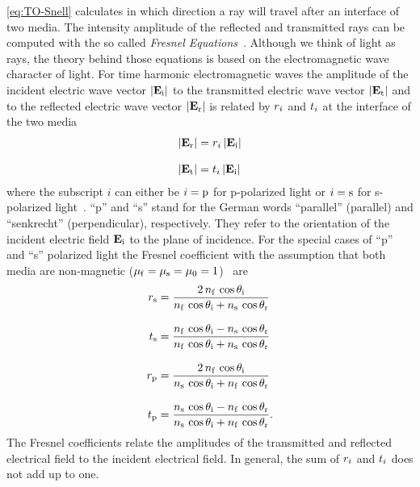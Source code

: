 
\cref{eq:TO-Snell} calculates in which direction a ray will travel after an 
interface of two media. The intensity amplitude of the reflected and 
transmitted rays can be computed with the so called \emph{Fresnel 
Equations}~\cite{Jackson2013,Born1980Ch1}. Although we think of light as rays, 
the theory behind those equations is based on the electromagnetic wave 
character of light. For time harmonic electromagnetic waves the amplitude of 
the incident electric wave vector $\abs{\vb{E}_{\mathrm{i}}}$ to the transmitted 
electric wave vector $\abs{\vb{E}_{\mathrm{t}}}$ and to the reflected electric wave 
vector $\abs{\vb{E}_{\mathrm{r}}}$ is related by $r_{i}$ and 
$t_{i}$ at the interface of the two media
\begin{subequations}
\begin{align}
  \abs{\vb{E}_{\mathrm{r}}} & =r_{i}\,\abs{\vb{E}_{\mathrm{i}}} \\[3mm]
  \abs{\vb{E}_{\mathrm{t}}} & =t_{i}\,\abs{\vb{E}_{\mathrm{i}}}
\end{align}
\end{subequations}
where the subscript $i$ can either be $i=\mathrm{p}$ for p-polarized light or 
$i=\mathrm{s}$ for s-polarized light~\cite{Jackson2013,Born1980Ch1}. ``p'' and 
``s'' stand for the German words ``parallel'' (parallel) and ``senkrecht'' 
(perpendicular), respectively. They refer to the orientation of the incident 
electric field $\vb{E}_{\mathrm{i}}$ to the plane of incidence. For the special 
cases of ``p'' and ``s'' polarized light the Fresnel coefficient with the 
assumption that both media are non-magnetic ($\mu_{\mathrm{f}} = \mu_{\mathrm{s}} = 
\mu_{0} = 1$)~\cite{Born1980Ch1} are
\begin{subequations}
\begin{align}
  r_{\mathrm{s}} & =
  \frac{2\,n_{\mathrm{f}}\,\cos\theta_{\mathrm{i}}}{n_{\mathrm{f}}\,\cos\theta_{\mathrm{i}} + n_{\mathrm{s}}\,\cos\theta_{\mathrm{r}}} 
  \label{eq:TO-fresnel-rs}\\[3mm]
  t_{\mathrm{s}} & = \frac{n_{\mathrm{f}}\,\cos\theta_{\mathrm{i}} - 
  n_{\mathrm{s}}\,\cos\theta_{\mathrm{r}}}{n_{\mathrm{f}}\,\cos\theta_{\mathrm{i}} + n_{\mathrm{s}}\,\cos\theta_{\mathrm{r}}} 
  \label{eq:TO-fresnel-ts}\\[3mm]
  r_{\mathrm{p}} & =
  \frac{2\,n_{\mathrm{f}}\,\cos\theta_{\mathrm{i}}}{n_{\mathrm{s}}\,\cos\theta_{\mathrm{i}} + n_{\mathrm{f}}\,\cos\theta_{\mathrm{r}}} 
  \label{eq:TO-fresnel-rp}\\[3mm]
  t_{\mathrm{p}} & = \frac{n_{\mathrm{s}}\,\cos\theta_{\mathrm{i}} - 
  n_{\mathrm{f}}\,\cos\theta_{\mathrm{r}}}{n_{\mathrm{s}}\,\cos\theta_{\mathrm{i}} + n_{\mathrm{f}}\,\cos\theta_{\mathrm{r}}}.
\label{eq:TO-fresnel-tp}
\end{align}
\end{subequations}
The Fresnel coefficients relate the amplitudes of the transmitted and reflected 
electrical field to the incident electrical field. In general, the sum of 
$r_{i}$ and $t_{i}$ does not add up to one.

